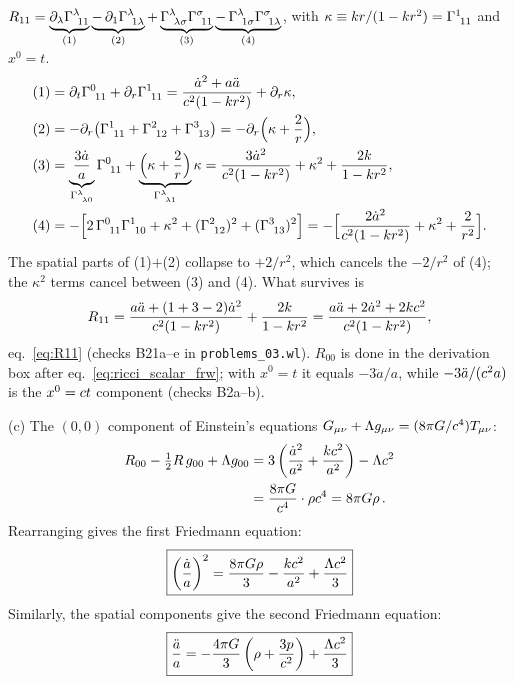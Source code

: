 \begin{derivation}
$R_{11} = \underbrace{\partial_\lambda\Gamma^{\lambda}_{\ 1 1}}_{(1)}
\underbrace{-\,\partial_1\Gamma^{\lambda}_{\ 1 \lambda}}_{(2)}
+\underbrace{\Gamma^{\lambda}_{\ \lambda \sigma}\Gamma^{\sigma}_{\ 1 1}}_{(3)}
\underbrace{-\,\Gamma^{\lambda}_{\ 1 \sigma}\Gamma^{\sigma}_{\ 1 \lambda}}_{(4)}$,
with $\kappa \equiv kr/(1-kr^2) = \Gamma^{1}_{\ 1 1}$ and $x^0 = t$.
\begin{align*}
(1)&= \partial_t\Gamma^{0}_{\ 1 1} + \partial_r\Gamma^{1}_{\ 1 1}
   = \frac{\dot a^2 + a\ddot a}{c^2(1-kr^2)} + \partial_r\kappa,\\
(2)&= -\partial_r\bigl(\Gamma^{1}_{\ 1 1} + \Gamma^{2}_{\ 1 2} + \Gamma^{3}_{\ 1 3}\bigr)
   = -\partial_r\Bigl(\kappa + \frac{2}{r}\Bigr),\\
(3)&= \underbrace{\frac{3\dot a}{a}}_{\Gamma^{\lambda}_{\ \lambda 0}}\Gamma^{0}_{\ 1 1}
   + \underbrace{\Bigl(\kappa + \frac{2}{r}\Bigr)}_{\Gamma^{\lambda}_{\ \lambda 1}}\kappa
   = \frac{3\dot a^2}{c^2(1-kr^2)} + \kappa^2 + \frac{2k}{1-kr^2},\\
(4)&= -\Bigl[2\,\Gamma^{0}_{\ 1 1}\Gamma^{1}_{\ 1 0} + \kappa^2
   + (\Gamma^{2}_{\ 1 2})^2 + (\Gamma^{3}_{\ 1 3})^2\Bigr]
   = -\Bigl[\frac{2\dot a^2}{c^2(1-kr^2)} + \kappa^2 + \frac{2}{r^2}\Bigr].
\end{align*}
The spatial parts of (1)$+$(2) collapse to $+2/r^2$, which cancels the $-2/r^2$
of (4); the $\kappa^2$ terms cancel between (3) and (4).  What survives is
\[
  R_{11} = \frac{a\ddot a + (1 + 3 - 2)\dot a^2}{c^2(1-kr^2)}
         + \frac{2k}{1-kr^2}
         = \frac{a\ddot a + 2\dot a^2 + 2kc^2}{c^2(1-kr^2)} ,
\]
eq.~\eqref{eq:R11} (checks B21a--e in \texttt{problems\_03.wl}).  $R_{00}$ is
done in the derivation box after eq.~\eqref{eq:ricci_scalar_frw}; with
$x^0 = t$ it equals $-3\ddot a/a$, while $-3\ddot a/(c^2 a)$ is the
$x^0 = c t$ component (checks B2a--b).
\end{derivation}
(c) The $(0,0)$ component of Einstein's equations
$G_{\mu\nu} + \Lambda g_{\mu\nu} = (8\pi G/c^4) T_{\mu\nu}$:
\begin{align*}
    R_{00} - \tfrac{1}{2} R\, g_{00} + \Lambda g_{00}
    &= 3\left(\frac{\dot{a}^2}{a^2}
    + \frac{kc^2}{a^2}\right) - \Lambda c^2 \\
    &= \frac{8\pi G}{c^4}\cdot\rho c^4
    = 8\pi G\rho \,.
\end{align*}
Rearranging gives the first Friedmann equation:
\[
    \boxed{\left(\frac{\dot{a}}{a}\right)^2
    = \frac{8\pi G\rho}{3}
    - \frac{kc^2}{a^2}
    + \frac{\Lambda c^2}{3}}
\]
Similarly, the spatial components give the second Friedmann equation:
\[
    \boxed{\frac{\ddot{a}}{a}
    = -\frac{4\pi G}{3}\left(\rho + \frac{3p}{c^2}\right)
    + \frac{\Lambda c^2}{3}}
\]


